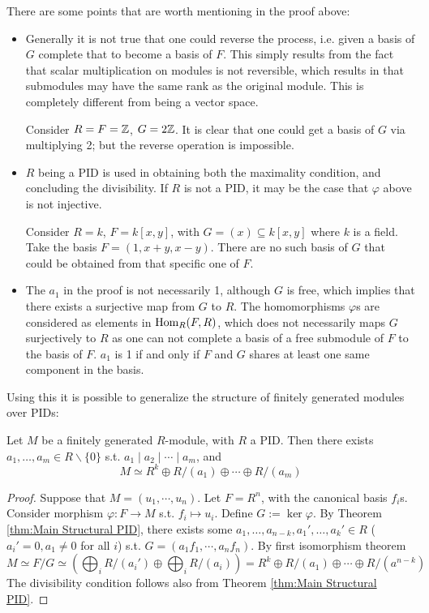 \documentclass{article}
\begin{document}
\begin{remark}
    There are some points that are worth mentioning in the proof above:
    \begin{itemize}
        \item Generally it is not true that one could reverse the process, i.e. given a basis of $G$ complete that to become a basis of $F$. This simply results from the fact that scalar multiplication on modules is not reversible, which results in that submodules may have the same rank as the original module. This is completely different from being a vector space.
        
        Consider $R = F = \mathbb{Z}$, $G = 2\mathbb{Z}$. It is clear that one could get a basis of $G$ via multiplying 2; but the reverse operation is impossible.
        \item $R$ being a PID is used in obtaining both the maximality condition, and concluding the divisibility. If $R$ is not a PID, it may be the case that $\varphi$ above is not injective. 
        
        Consider $R = k$, $F = k[x, y]$, with $G = (x) \subseteq k[x, y]$ where $k$ is a field. Take the basis $F = (1, x + y, x - y)$. There are no such basis of $G$ that could be obtained from that specific one of $F$.
        \item The $a_1$ in the proof is not necessarily 1, although $G$ is free, which implies that there exists a surjective map from $G$ to $R$. The homomorphisms $\varphi$s are considered as elements in $\mathrm{Hom}_R(F, R)$, which does not necessarily maps $G$ surjectively to $R$ as one can not complete a basis of a free submodule of $F$ to the basis of $F$. $a_1$ is 1 if and only if $F$ and $G$ shares at least one same component in the basis. 
    \end{itemize}
\end{remark}

Using this it is possible to generalize the structure of finitely generated modules over PIDs:

\begin{theorem}[Sturcture, v1]\label{thm:Structure f.g. modules over PID v1}
    Let $M$ be a finitely generated $R$-module, with $R$ a PID. Then there exists $a_1, \ldots, a_m \in R\smallsetminus\{0\}$ s.t. $a_1 \mid a_2 \mid \cdots \mid a_m$, and 
    \[
        M \simeq R^k \oplus R/(a_1) \oplus \cdots \oplus R/(a_m)
    \] 
\end{theorem}

\begin{proof}
    Suppose that $M = (u_1, \cdots, u_n)$. Let $F = R^n$, with the canonical basis $f_i$s. Consider morphism $\varphi: F \to M$ s.t. $f_i \mapsto u_i$. Define $G := \ker \varphi$. By Theorem \ref{thm:Main Structural PID}, there exists some $a_1, \ldots, a_{n-k}, a_1', \ldots, a_k' \in R$ ($a_i' = 0, a_1 \neq 0$ for all $i$) s.t. $G = (a_1f_1, \cdots, a_n f_n)$. By first isomorphism theorem 
    \[
        M \simeq F / G \simeq \left(\bigoplus_i R/(a_i') \oplus \bigoplus_i R/(a_i)\right) = R^k \oplus R/(a_1) \oplus \cdots \oplus R/(a^{n-k})
    \]
    The divisibility condition follows also from Theorem \ref{thm:Main Structural PID}.
\end{proof}
\end{document}
